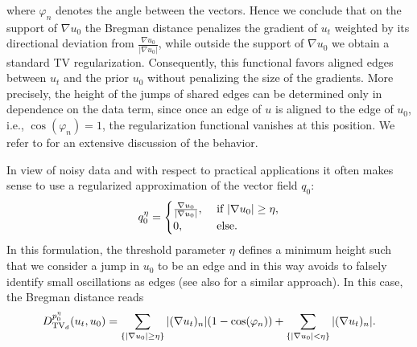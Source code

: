 where $\varphi_n$ denotes the angle between the vectors. 
Hence we conclude that on the support of $\nabla u_0$ the Bregman distance penalizes the gradient of $u_t$ weighted by its directional deviation from $\frac{\nabla u_0}{|\nabla u_0 |}$, while outside the support of $\nabla u_0$ we obtain a standard TV regularization. 
Consequently, this functional favors aligned edges between $u_t$ and the prior $u_0$ without penalizing the size of the gradients. 
More precisely, the height of the jumps of shared edges can be determined only in dependence on the data term, since once an edge of $u$ is aligned to the edge of $u_0$, i.e., $\cos(\varphi_n) = 1$, the regularization functional vanishes at this position. 
We refer to \cite{Moeller:ColorBregmanTV,Rasch2017} for an extensive discussion of the behavior.

In view of noisy data and with respect to practical applications it often makes sense to use a regularized approximation of the vector field $q_0$: 
\begin{align}\label{eq:subgrad_eta}
	q_0^\eta = \begin{cases}
			\frac{\nabla u_0}{|\nabla u_0|}, &\text{ if } |\nabla u_0| \geq \eta, \\
            0, &\text{ else.}
		\end{cases}
\end{align}
In this formulation, the threshold parameter $\eta$ defines a minimum height such that we consider a jump in $u_0$ to be an edge and in this way avoids to falsely identify small oscillations as edges (see also \cite{Ehrhardt2016} for a similar approach). 
In this case, the Bregman distance reads 
\begin{align}
	D_{\mathrm{TV}_d}^{p_0^\eta}(u_t,u_0) = \sum_{\{|\nabla u_0| \geq \eta \} } |(\nabla u_t)_n| (1 - \cos (\varphi_n)  ) + \sum_{\{|\nabla u_0| < \eta \} } |(\nabla u_t)_n|. 
    \label{eq:Bregman Distance with respect to p0eta}
\end{align}

